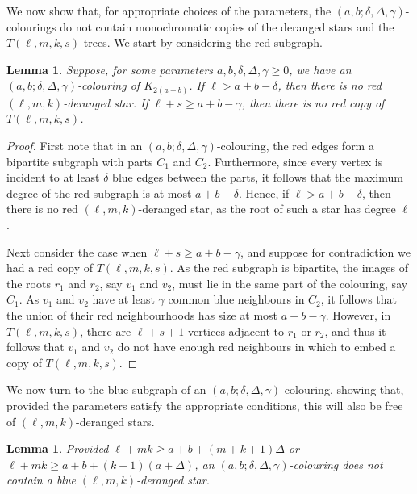 \documentclass[11pt]{article}
\newtheorem{lemma}[theorem]{Lemma}
\begin{document}
We now show that, for appropriate choices of the parameters, the $(a,b;\delta, \Delta, \gamma)$-colourings do not contain monochromatic copies of the deranged stars and the $T(\ell,m,k,s)$ trees. We start by considering the red subgraph.

\begin{lemma} \label{lem:no-red-copy}
    Suppose, for some parameters $a, b, \delta, \Delta, \gamma \ge 0$, we have an $(a,b;\delta, \Delta, \gamma)$-colouring of $K_{2(a+b)}$. If $\ell > a + b - \delta$, then there is no red $(\ell, m, k)$-deranged star. If $\ell + s \ge a + b - \gamma$, then there is no red copy of $T(\ell, m, k, s)$.
\end{lemma}

\begin{proof}
    First note that in an $(a,b;\delta, \Delta, \gamma)$-colouring, the red edges form a bipartite subgraph with parts $C_1$ and $C_2$. Furthermore, since every vertex is incident to at least $\delta$ blue edges between the parts, it follows that the maximum degree of the red subgraph is at most $a + b - \delta$. Hence, if $\ell > a + b - \delta$, then there is no red $(\ell, m, k)$-deranged star, as the root of such a star has degree $\ell$.

    Next consider the case when $\ell + s \ge a + b - \gamma$, and suppose for contradiction we had a red copy of $T(\ell, m, k, s)$. As the red subgraph is bipartite, the images of the roots $r_1$ and $r_2$, say $v_1$ and $v_2$, must lie in the same part of the colouring, say $C_1$. As $v_1$ and $v_2$ have at least $\gamma$ common blue neighbours in $C_2$, it follows that the union of their red neighbourhoods has size at most $a + b - \gamma$. However, in $T(\ell, m, k, s)$, there are $\ell + s + 1$ vertices adjacent to $r_1$ or $r_2$, and thus it follows that $v_1$ and $v_2$ do not have enough red neighbours in which to embed a copy of $T(\ell, m, k, s)$.
\end{proof}

We now turn to the blue subgraph of an $(a,b;\delta, \Delta, \gamma)$-colouring, showing that, provided the parameters satisfy the appropriate conditions, this will also be free of $(\ell,m,k)$-deranged stars.

\begin{lemma} \label{lem:no-blue-copy}
    Provided $\ell + mk \ge a + b + ( m + k + 1) \Delta$ or $\ell + mk \ge a + b + (k+1)(a + \Delta)$, an $(a,b;\delta, \Delta, \gamma)$-colouring does not contain a blue $(\ell,m,k)$-deranged star.
\end{lemma}
\end{document}
